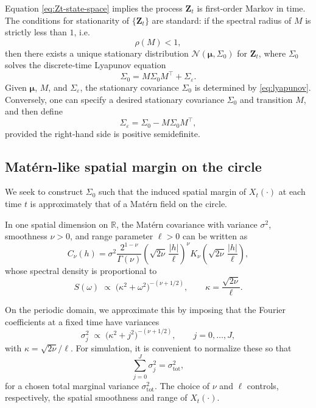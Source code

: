\documentclass[answers,12pt,addpoints]{exam}
\begin{document}
Equation \eqref{eq:Zt-state-space} implies the process $\mathbf{Z}_t$ is first-order Markov in time. The conditions for stationarity of $\{\mathbf{Z}_t\}$ are standard: if the spectral radius of $M$ is strictly less than $1$, i.e.
\[
  \rho(M) < 1,
\]
then there exists a unique stationary distribution $\mathcal{N}(\boldsymbol{\mu}, \Sigma_0)$ for $\mathbf{Z}_t$, where $\Sigma_0$ solves the discrete-time Lyapunov equation
\begin{equation}
  \Sigma_0
  =
  M\Sigma_0 M^\top + \Sigma_\varepsilon.
  \label{eq:lyapunov}
\end{equation}
Given $\boldsymbol{\mu}$, $M$, and $\Sigma_\varepsilon$, the stationary covariance $\Sigma_0$ is determined by \eqref{eq:lyapunov}. Conversely, one can specify a desired stationary covariance $\Sigma_0$ and transition $M$, and then define
\begin{equation}
  \Sigma_\varepsilon
  =
  \Sigma_0 - M\Sigma_0 M^\top,
  \label{eq:Sigma-eps-from-Sigma0}
\end{equation}
provided the right-hand side is positive semidefinite.

\subsection{Matérn-like spatial margin on the circle}

We seek to construct $\Sigma_0$ such that the induced spatial margin of $X_t(\cdot)$ at each time $t$ is approximately that of a Matérn field on the circle.

In one spatial dimension on $\mathbb{R}$, the Matérn covariance with variance $\sigma^2$, smoothness $\nu > 0$, and range parameter $\ell>0$ can be written as
\[
  C_\nu(h)
  =
  \sigma^2 \frac{2^{1-\nu}}{\Gamma(\nu)}
  \left(
    \sqrt{2\nu}\,\frac{|h|}{\ell}
  \right)^\nu
  K_\nu\!\left(
    \sqrt{2\nu}\,\frac{|h|}{\ell}
  \right),
\]
whose spectral density is proportional to
\[
  S(\omega)
  \;\propto\;
  \bigl(\kappa^2 + \omega^2\bigr)^{-(\nu + 1/2)},
  \qquad
  \kappa = \frac{\sqrt{2\nu}}{\ell}.
\]

On the periodic domain, we approximate this by imposing that the Fourier coefficients at a fixed time have variances
\begin{equation}
  \sigma_j^2
  \;\propto\;
  \bigl(\kappa^2 + j^2\bigr)^{-(\nu + 1/2)},
  \qquad j = 0,\dots,J,
  \label{eq:matern-spectrum-general}
\end{equation}
with $\kappa = \sqrt{2\nu}/\ell$. For simulation, it is convenient to normalize these so that
\begin{equation}
  \sum_{j=0}^{J} \sigma_j^2 = \sigma^2_{\text{tot}},
  \label{eq:sigma-normalization}
\end{equation}
for a chosen total marginal variance $\sigma^2_{\text{tot}}$. The choice of $\nu$ and $\ell$ controls, respectively, the spatial smoothness and range of $X_t(\cdot)$.
\end{document}
